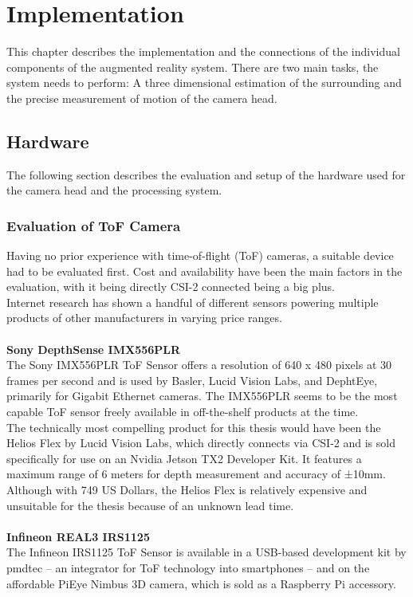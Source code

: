 \chapter{Implementation}
\label{sec:Implementation}
This chapter describes the implementation and the connections of the individual components of the augmented reality system. There are two main tasks, the system needs to perform: A three dimensional estimation of the surrounding and the precise measurement of motion of the camera head.
\section{Hardware}
\label{sec:Hardware}
The following section describes the evaluation and setup of the hardware used for the camera head and the processing system. 
\subsection{Evaluation of ToF Camera}
\label{sec:CamEvaluation}
Having no prior experience with time-of-flight (ToF) cameras, a suitable device had to be evaluated first. Cost and availability have been the main factors in the evaluation, with it being directly CSI-2 connected being a big plus.\\
Internet research has shown a handful of different sensors powering multiple products of other manufacturers in varying price ranges. \\
\\
\textbf{Sony DepthSense IMX556PLR}\\
The Sony IMX556PLR ToF Sensor offers a resolution of 640 x 480 pixels at 30 frames per second and is used by Basler, Lucid Vision Labs, and DephtEye, primarily for Gigabit Ethernet cameras. The IMX556PLR seems to be the most capable ToF sensor freely available in off-the-shelf products at the time.  \\
The technically most compelling product for this thesis would have been the Helios Flex by Lucid Vision Labs, which directly connects via CSI-2 and is sold specifically for use on an Nvidia Jetson TX2 Developer Kit. It features a maximum range of 6 meters for depth measurement and accuracy of ±10mm. Although with 749 US Dollars, the Helios Flex is relatively expensive and unsuitable for the thesis because of an unknown lead time.\\
\\
\textbf{Infineon REAL3 IRS1125}\\
The Infineon IRS1125 ToF Sensor is available in a USB-based development kit by pmdtec – an integrator for ToF technology into smartphones – and on the affordable PiEye Nimbus 3D camera, which is sold as a Raspberry Pi accessory.  \\
